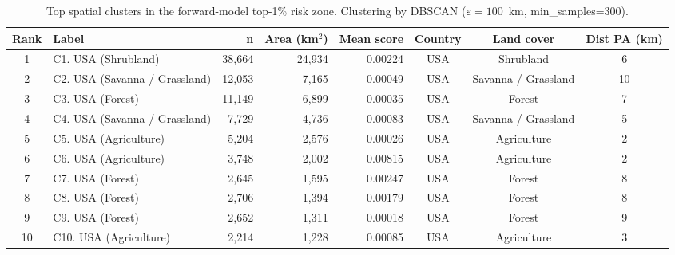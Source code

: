 \begin{table}[htbp]
  \centering
  \small
  \caption{Top spatial clusters in the forward-model top-1\% risk zone.
   Clustering by DBSCAN ($\varepsilon=100$~km, min\_samples=300).}
  \label{tab:spatial_clusters}
  \begin{tabular}{clrrrccc}
    \toprule
    Rank & Label & n & Area (km$^2$) & Mean score & Country & Land cover & Dist PA (km) \\
    \midrule
    1 & C1. USA (Shrubland) & 38,664 & 24,934 & 0.00224 & USA & Shrubland & 6 \\
    2 & C2. USA (Savanna / Grassland) & 12,053 & 7,165 & 0.00049 & USA & Savanna / Grassland & 10 \\
    3 & C3. USA (Forest) & 11,149 & 6,899 & 0.00035 & USA & Forest & 7 \\
    4 & C4. USA (Savanna / Grassland) & 7,729 & 4,736 & 0.00083 & USA & Savanna / Grassland & 5 \\
    5 & C5. USA (Agriculture) & 5,204 & 2,576 & 0.00026 & USA & Agriculture & 2 \\
    6 & C6. USA (Agriculture) & 3,748 & 2,002 & 0.00815 & USA & Agriculture & 2 \\
    7 & C7. USA (Forest) & 2,645 & 1,595 & 0.00247 & USA & Forest & 8 \\
    8 & C8. USA (Forest) & 2,706 & 1,394 & 0.00179 & USA & Forest & 8 \\
    9 & C9. USA (Forest) & 2,652 & 1,311 & 0.00018 & USA & Forest & 9 \\
    10 & C10. USA (Agriculture) & 2,214 & 1,228 & 0.00085 & USA & Agriculture & 3 \\
    \bottomrule
  \end{tabular}
\end{table}

